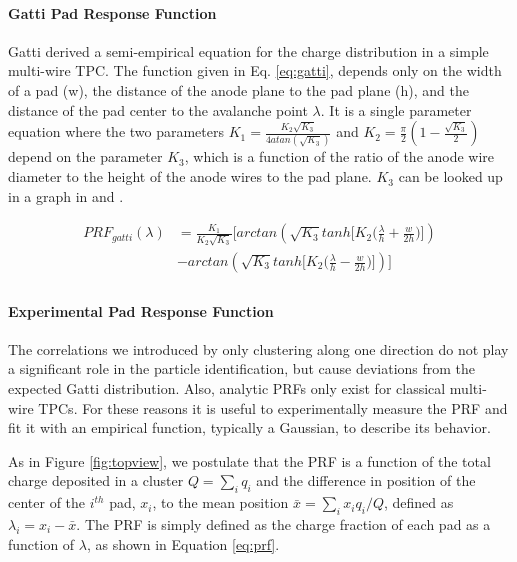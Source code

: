 \documentclass[review]{elsarticle}
\begin{document}
\paragraph{Gatti Pad Response Function}
Gatti \cite{gatti} derived a semi-empirical equation for the charge distribution in a simple multi-wire TPC. The function given in Eq. \ref{eq:gatti}, depends only on the width of a pad (w), the distance of the anode plane to the pad plane (h), and the distance of the pad center to the avalanche point $\lambda$. It is a single parameter equation where the two parameters $K_1 = \frac{K_{2}\sqrt{K_3}}{4 atan(\sqrt{K_3})}$ and $K_2 = \frac{\pi}{2}\left(1-\frac{\sqrt{K_{3}}}{2}\right)$ depend on the parameter $K_3$, which is a function of the ratio of the anode wire diameter to the height of the anode wires to the pad plane. $K_3$ can be looked up in a graph in \cite{blumrol} and \citep{gatti}.

\begin{equation}\label{eq:gatti}
\begin{split}
PRF_{gatti}(\lambda)
& = \frac{K_{1}}{K_{2}\sqrt{K_{3}}}\bigl[arctan(\sqrt{K_{3}}tanh\bigl[K_{2}\bigl(\frac{\lambda}{h}+\frac{w}{2h}\bigr)\bigr]) \\
& - arctan(\sqrt{K_{3}}tanh\bigl[K_{2}\bigl(\frac{\lambda}{h}-\frac{w}{2h}\bigr)\bigr])\bigr] \\
\end{split}
\end{equation}

\paragraph{Experimental Pad Response Function}

The correlations we introduced by only clustering along one direction do not play a significant role in the particle identification, but cause deviations from the expected Gatti distribution. Also, analytic PRFs only exist for classical multi-wire TPCs. For these reasons it is useful to experimentally measure the PRF and fit it with an empirical function, typically a Gaussian, to describe its behavior. 

As in Figure \ref{fig:topview}, we postulate that the PRF is a function of the total charge deposited in a cluster $Q = \sum_i q_i$ and the difference in position of the center of the $i^{th}$ pad, $x_i$, to the mean position $\bar{x} = \sum_i x_i q_i/Q$, defined as $\lambda_i = x_i-\bar{x}$. The PRF is simply defined as the charge fraction of each pad as a function of $\lambda$, as shown in Equation \ref{eq:prf}. 
\end{document}
